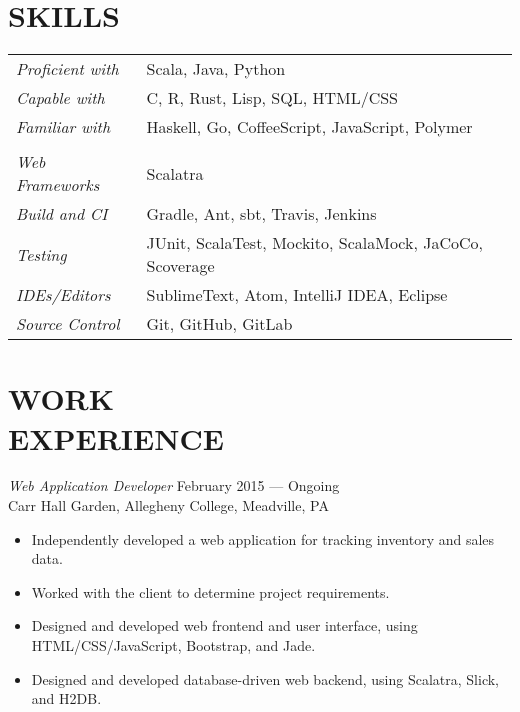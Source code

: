 \documentclass[margin]{res}
\begin{document}
\begin{resume}
\section{SKILLS}
   \begin{tabular}{l p{3in}}
                \textit{Proficient with} & Scala, Java, Python \\
                \textit{Capable with} & C, R, Rust, Lisp, SQL, HTML/CSS \\
                \textit{Familiar with} & Haskell, Go, CoffeeScript, JavaScript, Polymer \\ \\
                \textit{Web Frameworks}  & Scalatra \\
                \textit{Build and CI}  & Gradle, Ant, sbt, Travis, Jenkins \\
                \textit{Testing}  & JUnit, ScalaTest, Mockito, ScalaMock, JaCoCo, Scoverage \\
                \textit{IDEs/Editors}  & SublimeText, Atom, IntelliJ IDEA, Eclipse \\
                \textit{Source Control} &Git, GitHub, GitLab
 \end{tabular}


\section{WORK \\ EXPERIENCE} 

        {\sl Web Application Developer} \hfill  February 2015 --- Ongoing \\
                Carr Hall Garden, Allegheny College, Meadville, PA
                 \begin{itemize}  \itemsep -2pt %
                    \item Independently developed a web application for tracking inventory and sales data.
                    \item Worked with the client to determine project requirements.
                    \item Designed and developed web frontend and user interface, using HTML/CSS/JavaScript, Bootstrap, and Jade.
                    \item Designed and developed database-driven web backend, using Scalatra, Slick, and H2DB. 
                 \end{itemize}


\end{resume}
\end{document}
